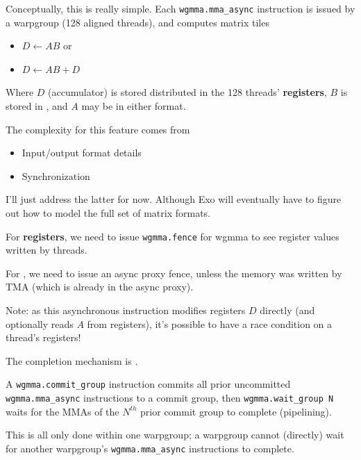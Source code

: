 \newpage
{}

\begin{minipage}[t]{0.5\textwidth}\fixminipage
Conceptually, this is really simple.
Each \texttt{wgmma.mma\_async} instruction is issued by a warpgroup (128 aligned threads), and computes matrix tiles
\begin{itemize}
  \item $D \leftarrow AB$ or
  \item $D \leftarrow AB + D$
\end{itemize}
Where $D$ (accumulator) is stored distributed in the 128 threads' \textbf{registers}, $B$ is stored in , and $A$ may be in either format.

The complexity for this feature comes from
\begin{itemize}
  \item Input/output format details 
  \item Synchronization
\end{itemize}
I'll just address the latter for now.
Although Exo will eventually have to figure out how to model the full set of matrix formats.
\end{minipage}
\hfill
\begin{minipage}[t]{0.5\textwidth}\fixminipage
{}

For \textbf{registers}, we need to issue \texttt{wgmma.fence} for wgmma to see register values written by threads.

For , we need to issue an async proxy fence, unless the memory was written by TMA (which is already in the async proxy).

Note: as this asynchronous instruction modifies registers $D$ directly (and optionally reads $A$ from registers), it's possible to have a race condition on a thread's registers!


The completion mechanism is .

A \texttt{wgmma.commit\_group} instruction commits all prior uncommitted \texttt{wgmma.mma\_async} instructions to a commit group, then \texttt{wgmma.wait\_group N} waits for the MMAs of the $N^{th}$ prior commit group to complete (pipelining).

This is all only done within one warpgroup; a warpgroup cannot (directly) wait for another warpgroup's \texttt{wgmma.mma\_async} instructions to complete.
\end{minipage}

